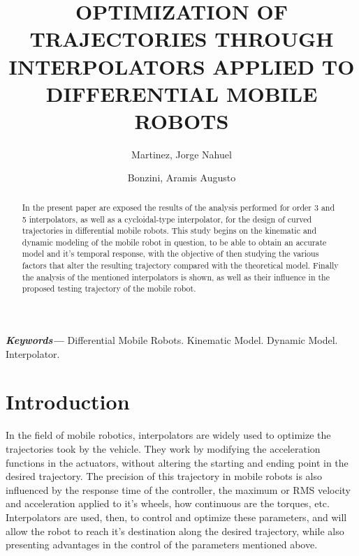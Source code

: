 \documentclass[a4paper]{aadeca}
\providecommand{\keywords}[1]
{
  \small	
  \textbf{\textit{Keywords---}} #1
}
\begin{document}
\renewcommand{\headrulewidth}{0pt}
\fancyhf{}



\begin{frontmatter}
\title{\vspace{-12pt} OPTIMIZATION OF TRAJECTORIES THROUGH INTERPOLATORS APPLIED TO DIFFERENTIAL MOBILE ROBOTS }
\author[Institucion2]{Martinez, Jorge Nahuel}
\author[Institucion2]{Bonzini, Aramis Augusto}

 
\address[Institucion1]{Tutors: Giannetta, Hernan M.R. and Granzella, Damian\\}
\address[Institucion2]{Universidad Tecnológica Nacional - Facultad Regional Buenos Aires - Electronics Department - martinez.jnahuel@gmail.com}

\renewcommand\abstractname{\textbf{Abstract: }}
\begin{abstract}
In the present paper are exposed the results of the analysis performed for order 3 and 5 interpolators, as well as a cycloidal-type interpolator, for the design of curved trajectories in differential mobile robots. 
This study begins on the kinematic and dynamic modeling of the mobile robot in question, to be able to obtain an accurate model and it's temporal response, with the objective of then studying the various factors that alter the resulting trajectory compared with the theoretical model.
Finally the analysis of the mentioned interpolators is shown, as well as their influence in the proposed testing trajectory of the mobile robot.
\end{abstract}

\keywords{Differential Mobile Robots. Kinematic Model. Dynamic Model. Interpolator.}

\end{frontmatter}
\thispagestyle{fancy}


\section{Introduction}

In the field of mobile robotics, interpolators are widely used to optimize the trajectories took by the vehicle.
They work by modifying the acceleration functions in the actuators, without altering the starting and ending point in the desired trajectory.
The precision of this trajectory in mobile robots is also influenced by the response time of the controller, the maximum or RMS velocity and acceleration applied to it's wheels, how continuous are the torques, etc. 
Interpolators are used, then, to control and optimize these parameters, and will allow the robot to reach it's destination along the desired trajectory, while also presenting advantages in the control of the parameters mentioned above.
\end{document}
